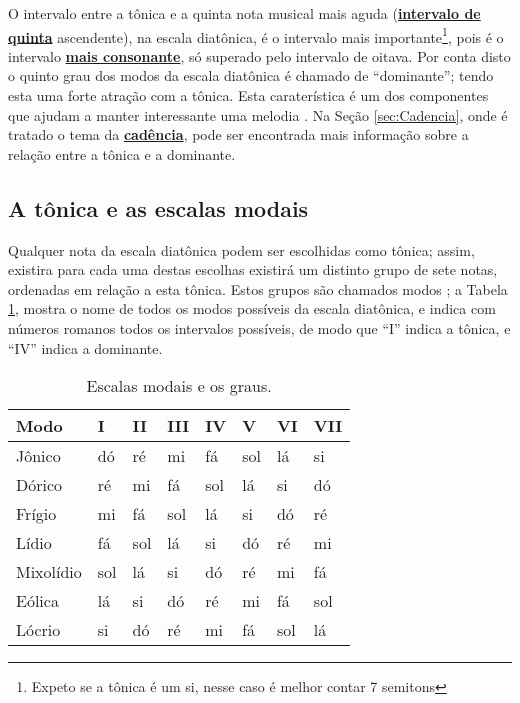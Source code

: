 O intervalo entre a tônica e a quinta nota musical mais aguda 
(\hyperref[fig:abc-iquinta2]{\textbf{intervalo de quinta}} ascendente), 
na escala diatônica, 
é o intervalo mais importante\footnote{Expeto se a tônica é um si, nesse caso é melhor contar 7 semitons},
pois é o intervalo \hyperref[tab:pitagorascromatica2]{\textbf{mais consonante}}, 
só superado pelo intervalo de oitava. 
Por conta disto o quinto grau dos modos da escala diatônica é chamado  de ``dominante'';
tendo esta uma forte atração com a tônica. 
Esta caraterística é um dos componentes que ajudam a manter interessante  uma melodia \cite[pp. 24]{holst1998abc}.
Na Seção \ref{sec:Cadencia}, onde é tratado o tema da \hyperref[sec:Cadencia]{\textbf{cadência}},
pode ser encontrada mais informação sobre a relação entre a tônica e a dominante.

\subsection{A tônica e as escalas modais}
Qualquer nota da escala diatônica podem ser escolhidas como tônica;
assim, existira para cada uma destas escolhas existirá um distinto grupo de sete notas,
ordenadas em relação a esta tônica. Estos grupos são chamados modos \cite[pp. 21]{holst1998abc};
a Tabela \ref{tab:modosdiatonica}, mostra o nome de todos os modos possíveis da escala diatônica,
e indica com números romanos todos os intervalos possíveis,
de modo que ``I'' indica a tônica, e ``IV'' indica a dominante.

\begin{table}[h]
  \centering
  \begin{tabular}{|l||l|l|l|l|l|l|l|}
  \hline
  Modo      & I   & II  & III & IV  & V   & VI  & VII \\ \hline \hline
  Jônico    & dó  & ré  & mi  & fá  & sol & lá  & si  \\ \hline
  Dórico    & ré  & mi  & fá  & sol & lá  & si  & dó  \\ \hline
  Frígio    & mi  & fá  & sol & lá  & si  & dó  & ré  \\ \hline
  Lídio     & fá  & sol & lá  & si  & dó  & ré  & mi  \\ \hline
  Mixolídio & sol & lá  & si  & dó  & ré  & mi  & fá  \\ \hline
  Eólica    & lá  & si  & dó  & ré  & mi  & fá  & sol \\ \hline
  Lócrio    & si  & dó  & ré  & mi  & fá  & sol & lá  \\ \hline
  \end{tabular}
  \caption{Escalas modais e os graus.}
  \label{tab:modosdiatonica}
\end{table}

